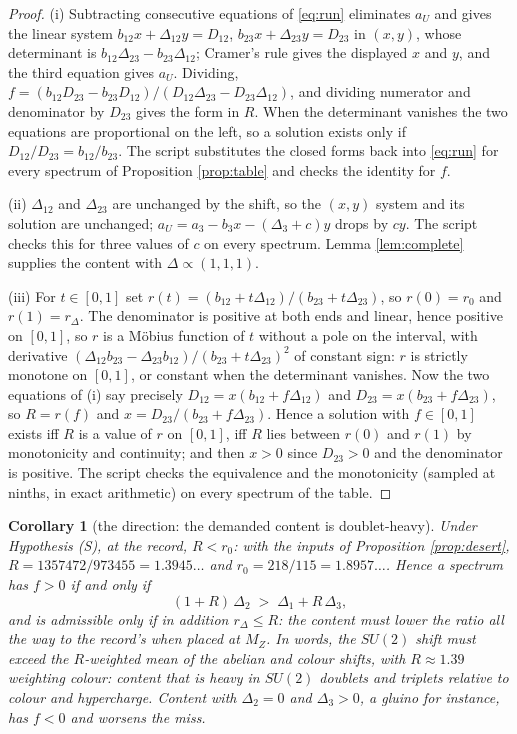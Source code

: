 \documentclass[11pt]{article}
\newtheorem{corollary}[theorem]{Corollary}
\theoremstyle{definition}
\newcommand{\Dl}{\Delta}
\begin{document}
\begin{proof}
(i) Subtracting consecutive equations of \eqref{eq:run} eliminates $a_{U}$ and gives the linear system $b_{12}x + \Dl_{12}y = D_{12}$, $b_{23}x + \Dl_{23}y = D_{23}$ in $(x, y)$, whose determinant is $b_{12}\Dl_{23} - b_{23}\Dl_{12}$; Cramer's rule gives the displayed $x$ and $y$, and the third equation gives $a_{U}$. Dividing, $f = (b_{12}D_{23} - b_{23}D_{12})/(D_{12}\Dl_{23} - D_{23}\Dl_{12})$, and dividing numerator and denominator by $D_{23}$ gives the form in $R$. When the determinant vanishes the two equations are proportional on the left, so a solution exists only if $D_{12}/D_{23} = b_{12}/b_{23}$. The script substitutes the closed forms back into \eqref{eq:run} for every spectrum of Proposition \ref{prop:table} and checks the identity for $f$.

(ii) $\Dl_{12}$ and $\Dl_{23}$ are unchanged by the shift, so the $(x, y)$ system and its solution are unchanged; $a_{U} = a_{3} - b_{3}x - (\Dl_{3} + c)y$ drops by $cy$. The script checks this for three values of $c$ on every spectrum. Lemma \ref{lem:complete} supplies the content with $\Dl \propto (1,1,1)$.

(iii) For $t \in [0, 1]$ set $r(t) = (b_{12} + t\Dl_{12})/(b_{23} + t\Dl_{23})$, so $r(0) = r_{0}$ and $r(1) = r_{\Dl}$. The denominator is positive at both ends and linear, hence positive on $[0, 1]$, so $r$ is a M\"obius function of $t$ without a pole on the interval, with derivative $(\Dl_{12}b_{23} - \Dl_{23}b_{12})/(b_{23} + t\Dl_{23})^{2}$ of constant sign: $r$ is strictly monotone on $[0, 1]$, or constant when the determinant vanishes. Now the two equations of (i) say precisely $D_{12} = x(b_{12} + f\Dl_{12})$ and $D_{23} = x(b_{23} + f\Dl_{23})$, so $R = r(f)$ and $x = D_{23}/(b_{23} + f\Dl_{23})$. Hence a solution with $f \in [0, 1]$ exists iff $R$ is a value of $r$ on $[0, 1]$, iff $R$ lies between $r(0)$ and $r(1)$ by monotonicity and continuity; and then $x > 0$ since $D_{23} > 0$ and the denominator is positive. The script checks the equivalence and the monotonicity (sampled at ninths, in exact arithmetic) on every spectrum of the table.
\end{proof}

\begin{corollary}[the direction: the demanded content is doublet-heavy]\label{cor:direction}
Under Hypothesis (S), at the record, $R < r_{0}$: with the inputs of Proposition \ref{prop:desert}, $R = 1357472/973455 = 1.3945\ldots$ and $r_{0} = 218/115 = 1.8957\ldots$. Hence a spectrum has $f > 0$ if and only if
\[
(1 + R)\,\Dl_{2} \;>\; \Dl_{1} + R\,\Dl_{3},
\]
and is admissible only if in addition $r_{\Dl} \le R$: the content must lower the ratio all the way to the record's when placed at $M_{Z}$. In words, the $SU(2)$ shift must exceed the $R$-weighted mean of the abelian and colour shifts, with $R \approx 1.39$ weighting colour: content that is heavy in $SU(2)$ doublets and triplets relative to colour and hypercharge. Content with $\Dl_{2} = 0$ and $\Dl_{3} > 0$, a gluino for instance, has $f < 0$ and worsens the miss.
\end{corollary}
\end{document}

